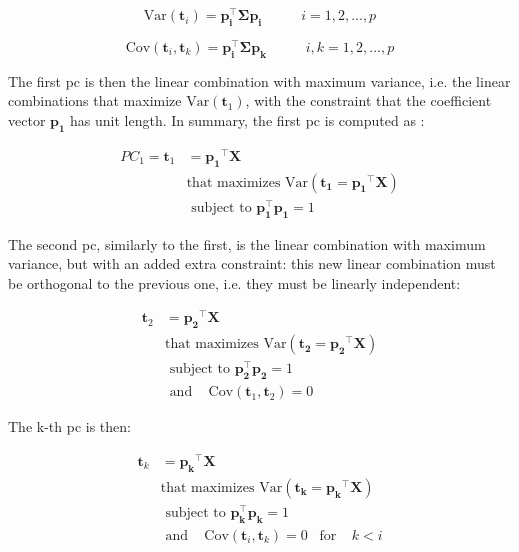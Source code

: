 \begin{equation}
	\label{eqn:pca-var}
	\text{Var}(\mathbf{t}_i) = \mathbf{p_i^\intercal \Sigma p_i} \;\;\;\;\;\;\;\;\;\; i = 1, 2, ..., p
\end{equation}

\begin{equation}
	\label{eqn:pca-cov}
	\text{Cov}(\mathbf{t}_i, \mathbf{t}_k) = \mathbf{p_i^\intercal \Sigma p_k}\;\;\;\;\;\;\;\;\;\; i,k= 1, 2, ..., p
\end{equation}

The first \acrfull{pc} is then the linear combination with maximum variance, i.e. the linear combinations that maximize $\text{Var}(\mathbf{t}_1)$, with the constraint that the coefficient vector $\mathbf{p_1}$ has unit length. In summary, the first \acrshort{pc} is computed as \parencite{johnson2013applied}:

\begin{equation}
	\label{eqn:pca-pc1}
	\begin{split}
		PC_1  = \mathbf{t}_1 & =\mathbf{p_1}^\intercal \mathbf{X}\\
			   & \text{that maximizes Var}(\mathbf{t_1}=\mathbf{p_1}^\intercal \mathbf{X}) \\
			   & \text{ subject to }  \mathbf{p_1^\intercal p_1} = 1
	\end{split}
\end{equation}

The second \acrshort{pc}, similarly to the first, is the linear combination with maximum variance, but with an added extra constraint: this new linear combination must be orthogonal to the previous one, i.e. they must be linearly independent:

\begin{equation}
	\label{eqn:pca-pc2}
	\begin{split}
		\mathbf{t}_2 & =\mathbf{p_2}^\intercal \mathbf{X}\\
		& \text{that maximizes Var}(\mathbf{t_2}=\mathbf{p_2}^\intercal \mathbf{X}) \\
		& \text{ subject to }  \mathbf{p_2^\intercal p_2} = 1\\
		& \text{ and } \;\;\; \text{Cov}(\mathbf{t}_1, \mathbf{t}_2) = 0
	\end{split}
\end{equation}

The k-th \acrshort{pc} is then:

\begin{equation}
	\label{eqn:pca-pck}
	\begin{split}
		\mathbf{t}_k & =\mathbf{p_k}^\intercal \mathbf{X}\\
		& \text{that maximizes Var}(\mathbf{t_k}=\mathbf{p_k}^\intercal \mathbf{X}) \\
		& \text{ subject to }  \mathbf{p_k^\intercal p_k} = 1\\
		& \text{ and } \;\;\; \text{Cov}(\mathbf{t}_i, \mathbf{t}_k) = 0 \;\;\; \text{for} \;\;\;\; k<i
	\end{split}
\end{equation}

